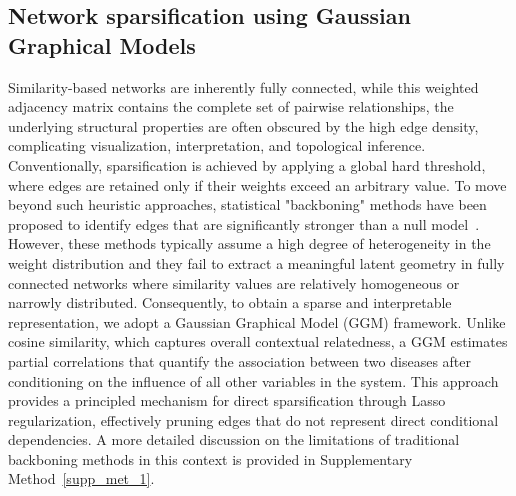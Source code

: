 \subsection{Network sparsification using Gaussian Graphical Models}\label{subsec:sparsification}
Similarity-based networks are inherently fully connected, while this weighted adjacency matrix contains the complete set of pairwise relationships, the underlying structural properties are often obscured by the high edge density, complicating visualization, interpretation, and topological inference. Conventionally, sparsification is achieved by applying a global hard threshold, where edges are retained only if their weights exceed an arbitrary value. To move beyond such heuristic approaches, statistical "backboning" methods have been proposed to identify edges that are significantly stronger than a null model~\citet{foti2011nonparametric}. However, these methods typically assume a high degree of heterogeneity in the weight distribution and they fail to extract a meaningful latent geometry in fully connected networks where similarity values are relatively homogeneous or narrowly distributed. Consequently, to obtain a sparse and interpretable representation, we adopt a Gaussian Graphical Model (GGM) framework. Unlike cosine similarity, which captures overall contextual relatedness, a GGM estimates partial correlations that quantify the association between two diseases after conditioning on the influence of all other variables in the system. This approach provides a principled mechanism for direct sparsification through Lasso regularization, effectively pruning edges that do not represent direct conditional dependencies. A more detailed discussion on the limitations of traditional backboning methods in this context is provided in Supplementary Method~\ref{supp_met_1}.

